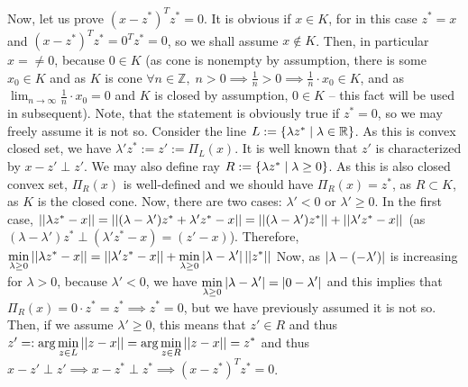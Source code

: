 \documentclass[8pt]{article} %
\begin{document}
\begin{enumerate}[label=\bfseries Problem \arabic*]
{		Now, let us prove
		$(x-z^*)^Tz^*=0$. It is obvious if $x\in K$, for in this case $z^*=x$ and $(x-z^*)^Tz^*=0^Tz^*=0$, so we shall assume
		$x\notin K$. Then, in particular $x=\neq 0$, because $0\in K$ (as cone is nonempty by assumption, there is some $x_0\in K$ and
		as $K$ is cone $\forall n\in\mathbb{Z},\;n>0\implies \frac{1}{n}>0\implies\frac{1}{n}\cdot x_0\in K$, and as
		$\lim_{n\to\infty}\frac{1}{n}\cdot x_0=0$ and $K$ is closed by assumption, $0\in K$ -- this fact will be used in subsequent).
		Note, that the statement is obviously true if $z^*=0$, so we may freely assume it is not so.
		Consider the line $L:=\left\{\lambda z^*\mid \lambda\in\mathbb{R}\right\}$. As this is convex closed set, we have 
		$\lambda'z^*:=z':=\Pi_L(x)$. It is well known that $z'$ is characterized by $x-z'\perp z'$. We may also define ray
		$R:=\left\{\lambda z^*\mid \lambda\geq 0\right\}$. As this is also closed convex set, $\Pi_R(x)$ is well-defined and we should have
		$\Pi_R(x)=z^*$, as $R\subset K$, as $K$ is the closed cone.
		Now, there are two cases: $\lambda'<0$ or $\lambda'\geq 0$. In the first case, $\left|\left|\lambda z^*-x\right|\right|=
		\left|\left|(\lambda-\lambda')z^*+\lambda'z^*-x\right|\right|=\left|\left|(\lambda-\lambda')z^*\right|\right|+\left|\left|\lambda'z^*-x\right|\right|$ (as
		$(\lambda-\lambda')z^*\perp(\lambda'z^*-x)=(z'-x)$). Therefore, $\min_{\lambda\geq 0}\mynorm{\lambda z^*-x}=
		\mynorm{\lambda'z^*-x}+
		\min_{\lambda\geq 0}\myabs{\lambda-\lambda'}\mynorm{z^*}$ Now, as $\left|\lambda-(-\lambda')\right|$ is increasing for
		$\lambda>0$, because $\lambda'<0$, we have $\min_{\lambda\geq 0}\myabs{\lambda-\lambda'}=\myabs{0-\lambda'}$ and
		this implies that $\Pi_R(x)=0\cdot z^*=z^*\implies z^*=0$, but we have previously assumed it is not so. Then, if we assume
		$\lambda'\geq 0$, this means that $z'\in R$ and thus $z'=:\arg\min_{z\in L}\mynorm{z-x}=\arg\min_{z\in R}\mynorm{z-x}=z^*$
		and thus $x-z'\perp z'\implies x-z^*\perp z^*\implies (x-z^*)^Tz^*=0$.

}
\end{enumerate}
\end{document}
